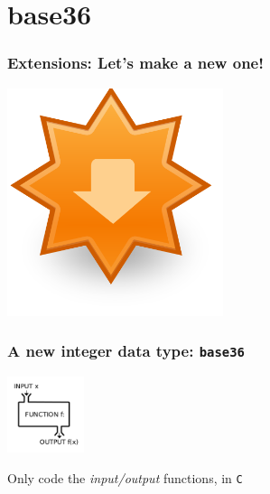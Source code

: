 \documentclass{beamer}
\begin{document}
\section{base36}

\begin{frame}[fragile]
  \frametitle{Extensions: Let's make a new one!}

\begin{center}
  \includegraphics[height=18em]{extension-update.png}
\end{center}
\end{frame}

\begin{frame}[fragile]
  \frametitle{A new integer data type: \texttt{base36}}

  \vfill

  \begin{center}
    \includegraphics[height=6em]{input-output.png}
  \end{center}

  \begin{center}
    Only code the \textit{input/output} functions, in \texttt{C}
  \end{center}

\end{frame}
\end{document}
